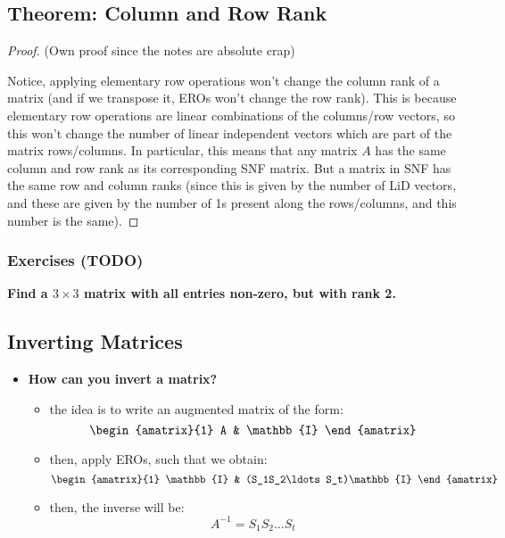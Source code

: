 \documentclass{exam}
\begin{document}
\subsection{Theorem: Column and Row Rank}


\begin{proof}

(Own proof since the notes are absolute crap)

Notice, applying elementary row operations won't change the column rank of a matrix (and if we transpose it, EROs won't change the row rank). This is because elementary row operations are linear combinations of the columns/row vectors, so this won't change the number of linear independent vectors which are part of the matrix rows/columns. In particular, this means that any matrix $A$ has the same column and row rank as its corresponding SNF matrix. But a matrix in SNF has the same row and column ranks (since this is given by the number of LiD vectors, and these are given by the number of 1s present along the rows/columns, and this number is the same).
\end{proof}

\subsubsection{Exercises (TODO)}

\begin{questions}

\question \textbf{Find a $3 \times 3$ matrix with all entries non-zero, but with rank 2.}

\end{questions}

\subsection{Inverting Matrices}

\begin{itemize}
    \item \textbf{How can you invert a matrix?}
    \begin{itemize}
        \item the idea is to write an augmented matrix of the form:
        \[
        \begin{amatrix}{1}
        A & \mathbb{I}
        \end{amatrix}
        \]
        \item then, apply EROs, such that we obtain:
        \[
        \begin{amatrix}{1}
        \mathbb{I} & (S_1S_2\ldots S_t)\mathbb{I}
        \end{amatrix}
        \]
        \item then, the inverse will be:
        \[
        A^{-1} = S_1S_2\ldots S_t
        \]
    \end{itemize}
\end{itemize}
\end{document}
